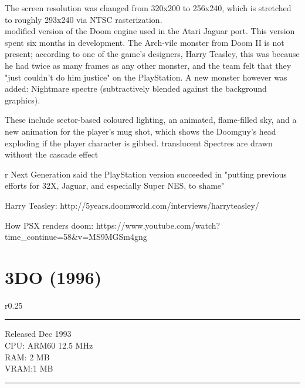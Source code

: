 The screen resolution was changed from 320x200 to 256x240, which is stretched to roughly 293x240 via NTSC rasterization.\\
modified version of the Doom engine used in the Atari Jaguar port. This version spent six months in development. The Arch-vile monster from Doom II is not present; according to one of the game's designers, Harry Teasley, this was because he had twice as many frames as any other monster, and the team felt that they "just couldn't do him justice" on the PlayStation. A new monster however was added: Nightmare spectre (subtractively blended against the background graphics).\\
\par
 These include sector-based coloured lighting, an animated, flame-filled sky, and a new animation for the player's mug shot, which shows the Doomguy's head exploding if the player character is gibbed. translucent Spectres are drawn without the cascade effect \\
\par
r Next Generation said the PlayStation version succeeded in "putting previous efforts for 32X, Jaguar, and especially Super NES, to shame" 
\par
Harry Teasley: http://5years.doomworld.com/interviews/harryteasley/\\
\par
{}
How PSX renders doom: https://www.youtube.com/watch?time\_continue=58\&v=MS9MGSm4gng\\
\par











\section{3DO (1996)}
\begin{wrapfigure}[22]{r}{0.25\textwidth}{\centering {}}
\hrule 
   Released Dec 1993\\
   CPU: ARM60 12.5 MHz\\
   RAM: 2 MB\\
   VRAM:1 MB\\
\hrule 
\end{wrapfigure}

